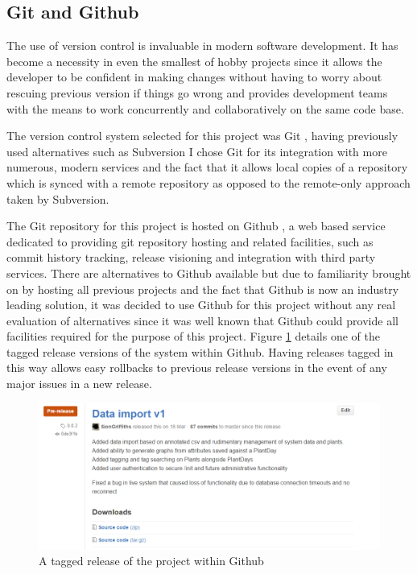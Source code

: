\subsection{Git and Github} \label{gitsection}

The use of version control is invaluable in modern software development. It has become a necessity in even the smallest of hobby projects since it allows the developer to be confident in making changes without having to worry about rescuing previous version if things go wrong and provides development teams with the means to work concurrently and collaboratively on the same code base. 

The version control system selected for this project was Git \cite{_git}, having previously used alternatives such as Subversion I chose Git for its integration with more numerous, modern services and the fact that it allows local copies of a repository which is synced with a remote repository as opposed to the remote-only approach taken by Subversion.

The Git repository for this project is hosted on Github \cite{_gitHub}, a web based service dedicated to providing git repository hosting and related facilities, such as commit history tracking, release visioning and integration with third party services. There are alternatives to Github available but due to familiarity brought on by hosting all previous projects and the fact that Github is now an industry leading solution, it was decided to use Github for this project without any real evaluation of alternatives since it was well known that Github could provide all facilities required for the purpose of this project. Figure \ref{fig:gitrel} details one of the tagged release versions of the system within Github. Having releases tagged in this way allows easy rollbacks to previous release versions in the event of any major issues in a new release. 

\begin{figure}[H]
    \centering
    \includegraphics[width=\textwidth]{images/tools/gitrel}
    \caption{A tagged release of the project within Github}
    \label{fig:gitrel}
\end{figure}

